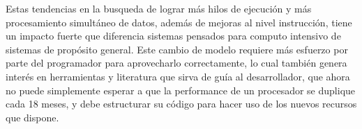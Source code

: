 Estas tendencias en la busqueda de lograr m\'as hilos de ejecuci\'on y m\'as procesamiento simult\'aneo de datos, adem\'as
de mejoras al nivel instrucci\'on, tiene un impacto fuerte que diferencia sistemas pensados para computo intensivo de
sistemas de prop\'osito general. Este cambio de modelo requiere m\'as esfuerzo por parte del programador para aprovecharlo
correctamente, lo cual tambi\'en genera inter\'es en herramientas y literatura que sirva de gu\'ia al desarrollador, que
ahora no puede simplemente esperar a que la performance de un procesador se duplique cada 18 meses, y debe estructurar su
c\'odigo para hacer uso de los nuevos recursos que dispone.
